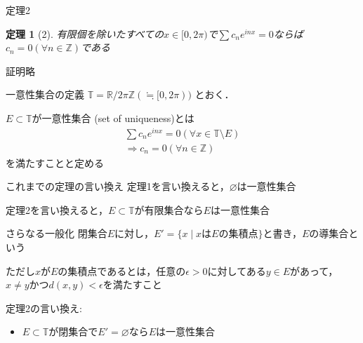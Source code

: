 \documentclass[dvipdfmx,17pt]{beamer}
\theoremstyle{plain}
\newtheorem{thm}{定理}
\newcommand{\Z}{\mathbb{Z}}
\newcommand{\R}{\mathbb{R}}
\begin{document}
\begin{frame}{定理2}
\begin{thm}[2]
有限個を除いたすべての$x \in [0, 2\pi)$で$\sum c_n e^{inx} = 0$ならば$c_n = 0 (\forall n \in \Z)$である
\end{thm}
\vspace{1cm}
証明略
\end{frame}

%
%
%
%
%
%
%

\begin{frame}{一意性集合の定義}
$\mathbb{T} = \R/2\pi\Z (\fallingdotseq [0, 2\pi))$ とおく．

$E \subset \mathbb{T}$が一意性集合 (set of uniqueness)とは
\begin{align*}
\sum c_n e^{inx} = 0 (\forall x \in \mathbb{T} \setminus E) \\
\Rightarrow c_n = 0 (\forall n\in\Z)
\end{align*}
を満たすことと定める
\end{frame}

\begin{frame}{これまでの定理の言い換え}
定理1を言い換えると，$\varnothing$は一意性集合

定理2を言い換えると，$E \subset \mathbb{T}$が有限集合なら$E$は一意性集合
\end{frame}

\begin{frame}{さらなる一般化}
閉集合$E$に対し，$E' = \{x \mid x\text{は}E\text{の集積点}\}$と書き，$E$の導集合という

{\footnotesize ただし$x$が$E$の集積点であるとは，任意の$\epsilon > 0$に対してある$y \in E$があって，$x \ne y$かつ$d(x, y) < \epsilon$を満たすこと}

定理2の言い換え:
\begin{itemize}
\item $E \subset \mathbb{T}$が閉集合で$E' = \varnothing$なら$E$は一意性集合
\end{itemize}
\end{frame}
\end{document}
